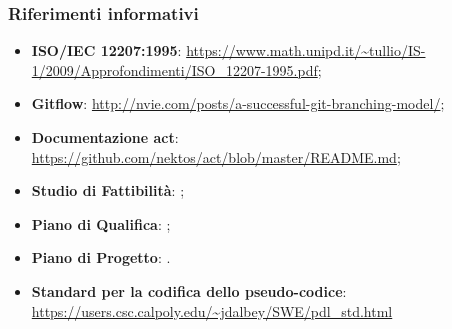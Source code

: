 	\subsubsection{Riferimenti informativi}
	\begin{itemize}
		\item \textbf{ISO/IEC 12207:1995}: \url{https://www.math.unipd.it/~tullio/IS-1/2009/Approfondimenti/ISO_12207-1995.pdf};
		\item \textbf{Gitflow}: \url{http://nvie.com/posts/a-successful-git-branching-model/};
		\item \textbf{Documentazione act}: \url{https://github.com/nektos/act/blob/master/README.md};
		\item \textbf{Studio di Fattibilità}: ;
		\item \textbf{Piano di Qualifica}: ;
		\item \textbf{Piano di Progetto}: .
		\item \textbf{Standard per la codifica dello pseudo-codice}: \url{https://users.csc.calpoly.edu/~jdalbey/SWE/pdl_std.html}
	\end{itemize}